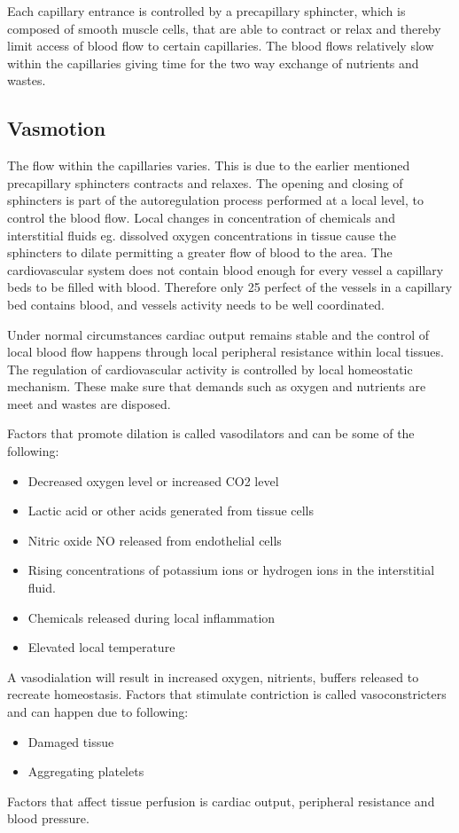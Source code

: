 Each capillary entrance is controlled by a precapillary sphincter, which is composed of smooth muscle cells, that are able to contract or relax and thereby limit access of blood flow to certain capillaries. The blood flows relatively slow within the capillaries giving time for the two way exchange of nutrients and wastes. \cite{martini2012}

\subsection{Vasmotion}

The flow within the capillaries varies. This is due to the earlier mentioned precapillary sphincters contracts and relaxes. The opening and closing of sphincters is part of the autoregulation process performed at a local level, to control the blood flow. Local changes in concentration of chemicals and interstitial fluids eg. dissolved oxygen concentrations in tissue cause the sphincters to dilate permitting a greater flow of blood to the area. The cardiovascular system does not contain blood enough for every vessel a capillary beds to be filled with blood. Therefore only 25 perfect of the vessels in a capillary bed contains blood, and vessels activity needs to be well coordinated.\cite{martini2012}

Under normal circumstances cardiac output remains stable and the control of local blood flow happens through local peripheral resistance within local tissues. The regulation of cardiovascular activity is controlled by local homeostatic mechanism. These make sure that demands such as oxygen and nutrients are meet and wastes are disposed.  \cite{martini2012} 

Factors that promote dilation is called vasodilators and can be some of the following: 
\begin{itemize}
	\item Decreased oxygen level or increased CO2 level
	\item Lactic acid or other acids generated from tissue cells
	\item Nitric oxide NO released from endothelial cells
	\item Rising concentrations of potassium ions or hydrogen ions in the interstitial fluid.
	\item Chemicals released during local inflammation
	\item Elevated local temperature
\end{itemize} 

A vasodialation will result in increased oxygen, nitrients, buffers released to recreate homeostasis.
Factors that stimulate contriction is called vasoconstricters and can happen due to following:

\begin{itemize}
	\item Damaged tissue
	\item Aggregating platelets 
\end{itemize}

Factors that affect tissue perfusion is cardiac output, peripheral resistance and blood pressure\cite{martini2012}. 






